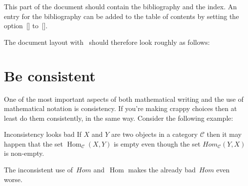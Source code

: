 \begin{myitemize}
    This part of the document should contain the bibliography and the index.
    An entry for the bibliography can be added to the table of contents by setting the option~[\optname] to~[\optname].
\end{myitemize}

The document layout with~ should therefore look roughly as follows:






\section{Be consistent}

One of the most important aspects of both mathematical writing and the use of mathematical notation is consistency.
If you’re making crappy choices then at least do them consistently, in the same way.
Consider the following example:
% 
% 
\begin{showlatex}{Inconsistency looks bad}
If $X$ and $Y$ are two objects in a category $$ then it may happen that the set $_{\mathcal{C}}(X,Y)$ is empty even though the set $Hom_{\mathcal{C}}(Y,X)$ is non-empty.
\end{showlatex}
The inconsistent use of~$Hom$ and~$$ makes the already bad~$Hom$ even worse.




